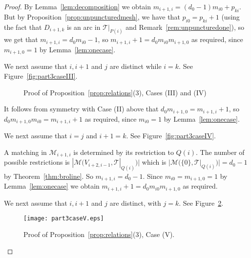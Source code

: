 \documentclass[a4paper]{amsart}
\begin{document}
\begin{proof}
By Lemma~\ref{lem:decomposition} we obtain
$m_{i+1,i}=(d_0-1)m_{i0}+p_{ki}.$
But by Proposition~\ref{prop:unpuncturedmesh}, we have that
$p_{i0}=p_{ki}+1$ (using the fact that $D_{i+1,k}$ is an arc in
${\mathcal T}|_{P(i)}$ and Remark~\ref{rem:unpuncturedone}), so we get that
$m_{i+1,i}=d_0m_{i0}-1$, so $m_{i+1,i}+1=d_0m_{i0}m_{i+1,0}$ as required,
since $m_{i+1,0}=1$ by Lemma~\ref{lem:onecase}.

We next assume that $i,i+1$ and $j$ are distinct while $i=k$.
See Figure~\ref{fig:part3caseIII}.

\begin{figure}\label{fig:part3caseIIIandIV}
\begin{center}
\hskip 2cm
\end{center}
\caption{Proof of Proposition~\ref{prop:relations}(3), Cases (III) and (IV)}
\end{figure}

It follows from symmetry with Case (II) above that
$d_0m_{i+1,0}=m_{i+1,i}+1$, so $d_0m_{i+1,0}m_{i0}=m_{i+1,i}+1$
as required, since $m_{i0}=1$ by Lemma~\ref{lem:onecase}.

We next assume that $i=j$ and $i+1=k$.
See Figure~\ref{fig:part3caseIV}.

A matching in ${\mathcal M}_{i+1,i}$ is determined by its restriction to $Q(i)$.
The number of possible restrictions is
$|{\mathcal M}(V_{i+2,i-1},{\mathcal T}|_{Q(i)})|$
which is $|{\mathcal M}(\{0\},{\mathcal T}|_{Q(i)})|=d_0-1$ by Theorem~\ref{thm:broline}.
So $m_{i+1,i}=d_0-1$. Since $m_{i0}=m_{i+1,0}=1$ by Lemma~\ref{lem:onecase}
we obtain $m_{i+1,i}+1=d_0m_{i0}m_{i+1,0}$ as required.

We next assume that $i,i+1$ and $j$ are distinct, with $j=k$.
See Figure~\ref{fig:part3caseV}.
\begin{figure}
\begin{center}
\texttt{[image: part3caseV.eps]}
\caption{Proof of Proposition~\ref{prop:relations}(3), Case (V).}
\label{fig:part3caseV}
\end{center}
\end{figure}


\end{proof}
\end{document}
